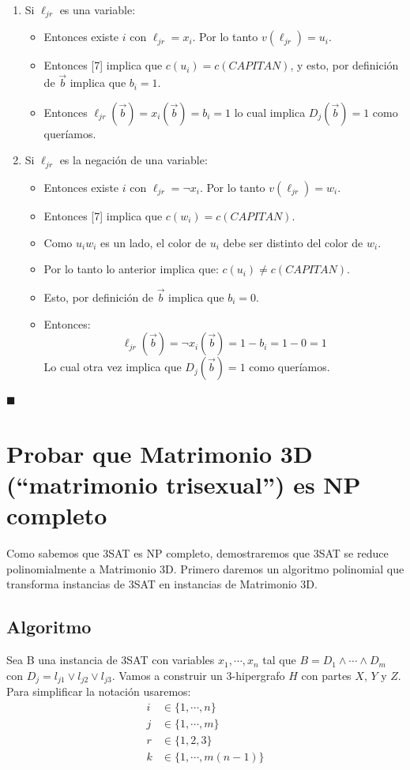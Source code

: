 \documentclass[11pt, a4paper]{article}
\theoremstyle{definition}
\begin{document}
\begin{enumerate}[label=\roman*.]
    \item Si $\ell_{jr}$ es una variable:
    \begin{itemize}
        \item Entonces existe $i$ con $\ell_{jr} = x_i$. Por lo tanto $v(\ell_{jr}) = u_i$.
        \item Entonces [7] implica que $c(u_i) = c(CAPITAN)$, y esto, por definición de $\vec{b}$ implica que $b_i = 1$.
        \item Entonces $\ell_{jr}(\vec{b}) = x_i(\vec{b}) = b_i = 1$ lo cual implica $D_j(\vec{b}) = 1$ como queríamos.
    \end{itemize}
    \item Si $\ell_{jr}$ es la negación de una variable:
    \begin{itemize}
        \item Entonces existe $i$ con $\ell_{jr} = \neg x_i$. Por lo tanto $v(\ell_{jr}) = w_i$.
        \item Entonces [7] implica que $c(w_i) = c(CAPITAN)$.
        \item Como $u_i w_i$ es un lado, el color de $u_i$ debe ser distinto del color de $w_i$.
        \item Por lo tanto lo anterior implica que: $c(u_i) \neq c(CAPITAN)$.
        \item Esto, por definición de $\vec{b}$ implica que $b_i = 0$.
        \item Entonces: 
                        \[
                            \ell_{jr}(\vec{b}) = \neg x_i(\vec{b}) = 1 - b_i = 1 - 0 = 1
                        \]
            Lo cual otra vez implica que $D_j(\vec{b}) = 1$ como queríamos.
    \end{itemize}
\end{enumerate}
\(\blacksquare\)
\section{Probar que Matrimonio 3D (“matrimonio trisexual”) es NP completo}
Como sabemos que 3SAT es NP completo, demostraremos que 3SAT se reduce polinomialmente a Matrimonio 3D. Primero daremos un algoritmo polinomial que transforma instancias
de 3SAT en instancias de Matrimonio 3D.

\subsection*{Algoritmo}
Sea B una instancia de 3SAT con variables \(x_1, \cdots, x_n\) tal que \({B = D_1 \land \cdots \land D_m}\) con \(D_j = l_{j1} \lor l_{j2} \lor l_{j3}\). Vamos a construir un 3-hipergrafo \(H\) con partes \(X\), \(Y\) y \(Z\). Para simplificar la notación usaremos:
\begin{align*}
i & \in \{1, \cdots, n\} \\
j & \in \{1, \cdots, m\} \\
r & \in \{1, 2, 3\} \\
k & \in \{1, \cdots, m(n-1)\} \\
\end{align*}
\end{document}
